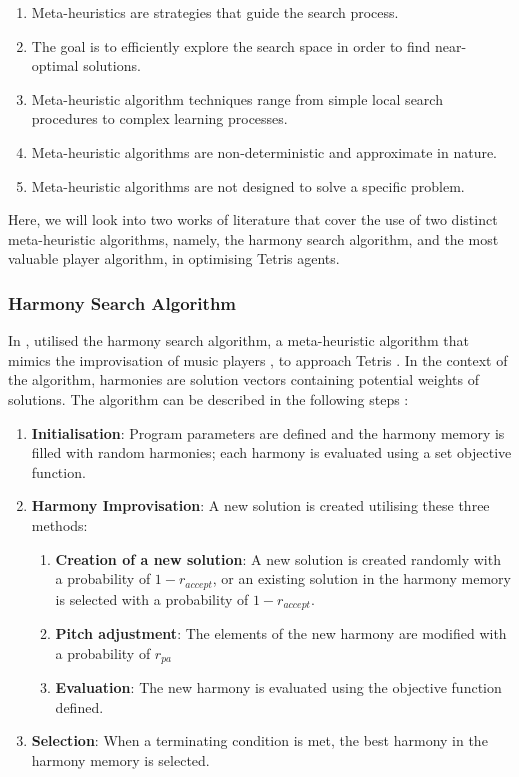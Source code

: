 \documentclass[a4paper, 12pt]{extreport}
\begin{document}
	\begin{enumerate}
		\item Meta-heuristics are strategies that guide the search process.
		\item The goal is to efficiently explore the search space in order to find near-optimal solutions.
		\item Meta-heuristic algorithm techniques range from simple local search procedures to complex learning processes.
		\item Meta-heuristic algorithms are non-deterministic and approximate in nature.
		\item Meta-heuristic algorithms are not designed to solve a specific problem.
	\end{enumerate}
	
	Here, we will look into two works of literature that cover the use of two distinct meta-heuristic algorithms, namely, the harmony search algorithm, and the most valuable player algorithm, in optimising Tetris agents.
	
	\subsubsection{Harmony Search Algorithm}
	
	In \citeyear{tetris-harmony-search}, \citeauthor{tetris-harmony-search} utilised the harmony search algorithm, a meta-heuristic algorithm that mimics the improvisation of music players \cite{harmony-search}, to approach Tetris \cite{tetris-harmony-search}. In the context of the algorithm, harmonies are solution vectors containing potential weights of solutions. The algorithm can be described in the following steps \cite{tetris-harmony-search}:
	
	\begin{enumerate}
		\item \textbf{Initialisation}: Program parameters are defined and the harmony memory is filled with random harmonies; each harmony is evaluated using a set objective function.
		\item \textbf{Harmony Improvisation}: A new solution is created utilising these three methods:
		\begin{enumerate}
			\item \textbf{Creation of a new solution}: A new solution is created randomly with a probability of $1 - r_{accept}$, or an existing solution in the harmony memory is selected with a probability of $1 - r_{accept}$.
			\item \textbf{Pitch adjustment}: The elements of the new harmony are modified with a probability of $r_{pa}$
			\item \textbf{Evaluation}: The new harmony is evaluated using the objective function defined.
		\end{enumerate}
		\item \textbf{Selection}: When a terminating condition is met, the best harmony in the harmony memory is selected.
	\end{enumerate}
	
\end{document}
